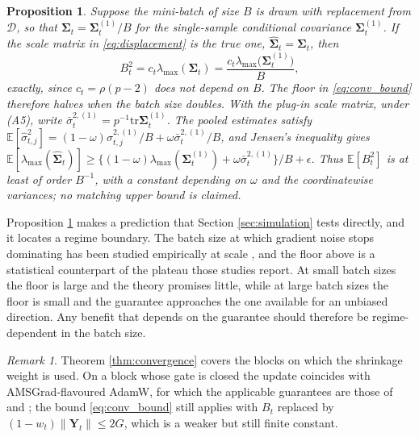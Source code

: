 \documentclass[a4paper,fleqn]{cas-dc}
\theoremstyle{plain}
\newtheorem{proposition}[theorem]{Proposition}
\theoremstyle{definition}
\theoremstyle{remark}
\newtheorem{remark}{Remark}
\newcommand{\tr}{\mathrm{tr}}
\newcommand{\E}{\mathbb{E}}
\begin{document}
\begin{proposition}
\label{prop:batch}
Suppose the mini-batch of size $B$ is drawn with replacement from $\mathcal D$, so that $\bm\Sigma_t=\bm\Sigma^{(1)}_t/B$ for the single-sample conditional covariance $\bm\Sigma^{(1)}_t$. If the scale matrix in \eqref{eq:displacement} is the true one, $\widehat{\bm\Sigma}_t=\bm\Sigma_t$, then
\begin{equation}
B^2_t=c_t\lambda_{\max}(\bm\Sigma_t)=\frac{c_t\lambda_{\max}\bigl(\bm\Sigma^{(1)}_t\bigr)}{B},
\end{equation}
exactly, since $c_t=\rho(p-2)$ does not depend on $B$. The floor in \eqref{eq:conv_bound} therefore halves when the batch size doubles. With the plug-in scale matrix, under (A5), write $\bar\sigma_t^{2,(1)}=p^{-1}\tr\bm\Sigma_t^{(1)}$. The pooled estimates satisfy $\E[\hat\sigma^2_{t,j}]=(1-\omega)\sigma^{2,(1)}_{t,j}/B+\omega\bar\sigma_t^{2,(1)}/B$, and Jensen's inequality gives $\E[\lambda_{\max}(\widehat{\bm\Sigma}_t)]\ge\{(1-\omega)\lambda_{\max}(\bm\Sigma_t^{(1)})+\omega\bar\sigma_t^{2,(1)}\}/B+\epsilon$. Thus $\E[B^2_t]$ is at least of order $B^{-1}$, with a constant depending on $\omega$ and the coordinatewise variances; no matching upper bound is claimed.
\end{proposition}

Proposition \ref{prop:batch} makes a prediction that Section \ref{sec:simulation} tests directly, and it locates a regime boundary. The batch size at which gradient noise stops dominating has been studied empirically at scale \citep{keskar2017, smith2018, shallue2019}, and the floor above is a statistical counterpart of the plateau those studies report. At small batch sizes the floor is large and the theory promises little, while at large batch sizes the floor is small and the guarantee approaches the one available for an unbiased direction. Any benefit that depends on the guarantee should therefore be regime-dependent in the batch size.

\begin{remark}
Theorem \ref{thm:convergence} covers the blocks on which the shrinkage weight is used. On a block whose gate is closed the update coincides with AMSGrad-flavoured AdamW, for which the applicable guarantees are those of \citet{reddi2018} and \citet{chen2019}; the bound \eqref{eq:conv_bound} still applies with $B_t$ replaced by $(1-w_t)\|\bm Y_t\|\le 2G$, which is a weaker but still finite constant.
\end{remark}

\end{document}
